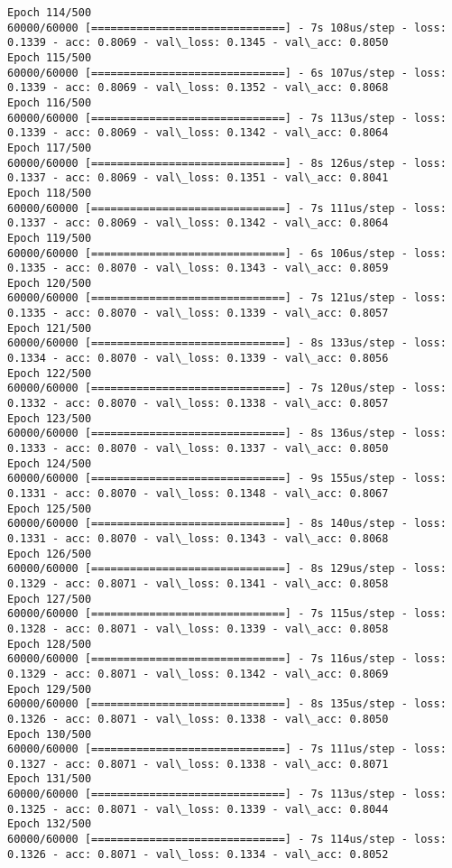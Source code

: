 \documentclass[11pt]{article}
\begin{document}
\begin{Verbatim}[commandchars=\\\{\}]
Epoch 114/500
60000/60000 [==============================] - 7s 108us/step - loss: 0.1339 - acc: 0.8069 - val\_loss: 0.1345 - val\_acc: 0.8050
Epoch 115/500
60000/60000 [==============================] - 6s 107us/step - loss: 0.1339 - acc: 0.8069 - val\_loss: 0.1352 - val\_acc: 0.8068
Epoch 116/500
60000/60000 [==============================] - 7s 113us/step - loss: 0.1339 - acc: 0.8069 - val\_loss: 0.1342 - val\_acc: 0.8064
Epoch 117/500
60000/60000 [==============================] - 8s 126us/step - loss: 0.1337 - acc: 0.8069 - val\_loss: 0.1351 - val\_acc: 0.8041
Epoch 118/500
60000/60000 [==============================] - 7s 111us/step - loss: 0.1337 - acc: 0.8069 - val\_loss: 0.1342 - val\_acc: 0.8064
Epoch 119/500
60000/60000 [==============================] - 6s 106us/step - loss: 0.1335 - acc: 0.8070 - val\_loss: 0.1343 - val\_acc: 0.8059
Epoch 120/500
60000/60000 [==============================] - 7s 121us/step - loss: 0.1335 - acc: 0.8070 - val\_loss: 0.1339 - val\_acc: 0.8057
Epoch 121/500
60000/60000 [==============================] - 8s 133us/step - loss: 0.1334 - acc: 0.8070 - val\_loss: 0.1339 - val\_acc: 0.8056
Epoch 122/500
60000/60000 [==============================] - 7s 120us/step - loss: 0.1332 - acc: 0.8070 - val\_loss: 0.1338 - val\_acc: 0.8057
Epoch 123/500
60000/60000 [==============================] - 8s 136us/step - loss: 0.1333 - acc: 0.8070 - val\_loss: 0.1337 - val\_acc: 0.8050
Epoch 124/500
60000/60000 [==============================] - 9s 155us/step - loss: 0.1331 - acc: 0.8070 - val\_loss: 0.1348 - val\_acc: 0.8067
Epoch 125/500
60000/60000 [==============================] - 8s 140us/step - loss: 0.1331 - acc: 0.8070 - val\_loss: 0.1343 - val\_acc: 0.8068
Epoch 126/500
60000/60000 [==============================] - 8s 129us/step - loss: 0.1329 - acc: 0.8071 - val\_loss: 0.1341 - val\_acc: 0.8058
Epoch 127/500
60000/60000 [==============================] - 7s 115us/step - loss: 0.1328 - acc: 0.8071 - val\_loss: 0.1339 - val\_acc: 0.8058
Epoch 128/500
60000/60000 [==============================] - 7s 116us/step - loss: 0.1329 - acc: 0.8071 - val\_loss: 0.1342 - val\_acc: 0.8069
Epoch 129/500
60000/60000 [==============================] - 8s 135us/step - loss: 0.1326 - acc: 0.8071 - val\_loss: 0.1338 - val\_acc: 0.8050
Epoch 130/500
60000/60000 [==============================] - 7s 111us/step - loss: 0.1327 - acc: 0.8071 - val\_loss: 0.1338 - val\_acc: 0.8071
Epoch 131/500
60000/60000 [==============================] - 7s 113us/step - loss: 0.1325 - acc: 0.8071 - val\_loss: 0.1339 - val\_acc: 0.8044
Epoch 132/500
60000/60000 [==============================] - 7s 114us/step - loss: 0.1326 - acc: 0.8071 - val\_loss: 0.1334 - val\_acc: 0.8052

\end{Verbatim}
\end{document}
